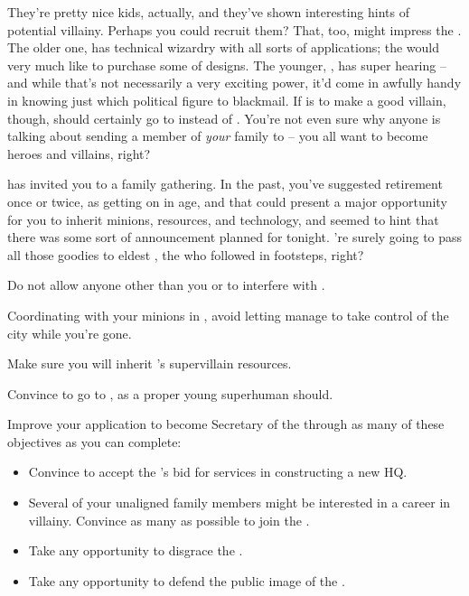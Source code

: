 \documentclass[char]{LRSguildcamp1}
\begin{document}
They're pretty nice kids, actually, and they've shown interesting hints of potential villainy.  Perhaps you could recruit them?  That, too, might impress the \cVillainCompact{}.  The older one, \cTeen{} has technical wizardry with all sorts of applications; the \cVillainCompact{} would very much like to purchase some of \cTeen{\their} designs.  The younger, \cTween{}, has super hearing -- and while that's not necessarily a very exciting power, it'd come in awfully handy in knowing just which political figure to blackmail.  If \cTween{} is to make a good villain, though, \cTween{\they} should certainly go to \pSuperSchool{} instead of \pNormalSchool{}.  You're not even sure why anyone is talking about sending a member of {\em your} family to \pNormalSchool{} -- you all want to become heroes and villains, right?

\cGrandma{} has invited you to a family gathering.  In the past, you've suggested retirement once or twice, as \cGrandma{\theyare} getting on in age, and that could present a major opportunity for you to inherit \cGrandma{\their} minions, resources, and technology, and \cGrandma{} seemed to hint that there was some sort of announcement planned for tonight.  \cGrandma{\They}'re surely going to pass all those goodies to \cGrandma{\their} eldest \cOldest{\offspring}, the \cOldest{\villain} who followed in \cGrandma{\their} footsteps, right?

\begin{itemz}[Goals]
	\item Do not allow anyone other than you or \cOS{} to interfere with \pCityO{}.  %
	\item Coordinating with your minions in \pCityO{}, avoid letting \cOS{} manage to take control of the city while you're gone.
	\item Make sure you will inherit \cGrandma{}'s supervillain resources. %
	\item Convince \cTween{} to go to \pSuperSchool{}, as a proper young superhuman should.
	\item Improve your application to become Secretary of the \cVillainCompact{\intro} through as many of these objectives as you can complete:
	\begin{itemize}
		\item Convince \cArchitect{} to accept the \cVillainCompact{}'s bid for \cArchitect{\their} services in constructing a new HQ.
		\item Several of your unaligned family members might be interested in a career in villainy.  Convince as many as possible to join the \cVillainCompact{\intro}.
		\item Take any opportunity to disgrace the \cHeroLeague{\intro}.
		\item Take any opportunity to defend the public image of the \cVillainCompact{}.  %
	\end{itemize}
\end{itemz}
\end{document}
